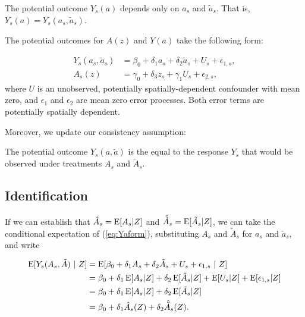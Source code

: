 \documentclass[12pt]{article}
\begin{document}
\begin{assumption} \label{a:nterferenceForm}
The potential outcome $Y_s(a)$ depends only on $a_s$ and $\tilde{a}_s$.  That is, $Y_s(a) = Y_s(a_s, \tilde{a}_s)$.
\end{assumption}

\begin{assumption}
The potential outcomes for $A(z)$ and $Y(a)$ take the following form:

\begin{align}
  Y_s(a_s, \tilde{a}_s) &= \beta_0 + \delta_1 a_s + \delta_2 \tilde{a}_s + U_s + \epsilon_{1,s}, \label{eq:Yaform}\\
    A_s(z) &= \gamma_0 + \delta_3 z_s + \gamma_1 U_s + \epsilon_{2,s},\label{eq:Azform}
\end{align}
\noindent where $U$ is an unobserved, potentially spatially-dependent confounder with mean zero, and $\epsilon_1$ and $\epsilon_2$ are mean zero error processes. Both error terms are potentially spatially dependent.
\end{assumption}

Moreover, we update our consistency assumption:

\begin{assumption}[Consistency] 
The potential outcome $Y_s(a,\tilde{a})$ is the equal to the response $Y_s$ that would be observed under treatments $A_s$ and $\tilde{A}_s$.
\end{assumption}


\subsection{Identification}\label{ss3:identificationInterference}
If we can establish that 
$\hat{A}_s = \operatorname{E} [A_s | Z]$ and $\hat{\tilde{A}}_s = \operatorname{E} [\tilde{A}_s | Z]$, 
we can take the conditional expectation of (\ref{eq:Yaform}), substituting $A_s$ and $\tilde{A}_s$ for $a_s$ and $\tilde{a}_s$, and write

\begin{align*}
\operatorname{E} [ Y_s(A_s, \tilde{A}) ~|~ Z] 
&= \operatorname{E} [ \beta_0 + \delta_1 A_s + \delta_2 \tilde{A}_s + U_s + 
\epsilon_{1,s} ~|~ Z ] \\
&= \beta_0 + \delta_1 \operatorname{E} [A_s|Z] + \delta_2 \operatorname{E} [ \tilde{A}_s | Z] + 
\operatorname{E} [U_s|Z] + \operatorname{E}[\epsilon_{1,s} | Z] \\
&=  \beta_0 + \delta_1 \operatorname{E} [A_s|Z] + \delta_2 \operatorname{E} [\tilde{A}_s|Z] \\
&=  \beta_0 + \delta_1 \hat{A}_s(Z)  + \delta_2 \hat{\tilde{A}}_s(Z).
\end{align*}
\end{document}
